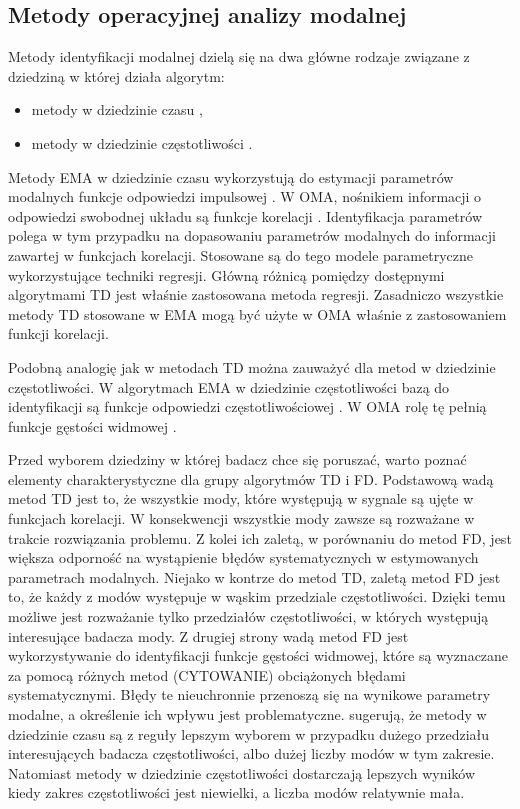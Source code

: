 \subsection{Metody operacyjnej analizy modalnej}

Metody identyfikacji modalnej dzielą się na dwa główne rodzaje związane z dziedziną w której działa algorytm:
\begin{itemize}[noitemsep]
	\item metody w dziedzinie czasu ,
	\item metody w dziedzinie częstotliwości .
\end{itemize}
Metody EMA w dziedzinie czasu wykorzystują do estymacji parametrów modalnych funkcje odpowiedzi impulsowej . W OMA, nośnikiem informacji o odpowiedzi swobodnej układu  są funkcje korelacji . Identyfikacja parametrów polega w tym przypadku na dopasowaniu parametrów modalnych do informacji zawartej w funkcjach korelacji. Stosowane są do tego modele parametryczne wykorzystujące techniki regresji. Główną różnicą pomiędzy dostępnymi algorytmami TD jest właśnie zastosowana metoda regresji. Zasadniczo wszystkie metody TD stosowane w EMA mogą być użyte w OMA właśnie z zastosowaniem funkcji korelacji. 


Podobną analogię jak w metodach TD można zauważyć dla metod w dziedzinie częstotliwości. W algorytmach EMA w dziedzinie częstotliwości bazą do identyfikacji są funkcje odpowiedzi częstotliwościowej . W OMA rolę tę pełnią funkcje gęstości widmowej .

Przed wyborem dziedziny w której badacz chce się poruszać, warto poznać elementy charakterystyczne dla grupy algorytmów TD i FD. Podstawową wadą metod TD jest to, że wszystkie mody, które występują w sygnale są ujęte w funkcjach korelacji. W konsekwencji wszystkie mody zawsze są rozważane w trakcie rozwiązania problemu. Z kolei ich zaletą, w porównaniu do metod FD, jest większa odporność na wystąpienie błędów systematycznych w estymowanych parametrach modalnych. Niejako w kontrze do metod TD, zaletą metod FD jest to, że każdy z modów występuje w wąskim przedziale częstotliwości. Dzięki temu możliwe jest rozważanie tylko przedziałów częstotliwości, w których występują interesujące badacza mody. Z drugiej strony wadą metod FD jest wykorzystywanie do identyfikacji funkcje gęstości widmowej, które są wyznaczane za pomocą różnych metod (CYTOWANIE) obciążonych błędami systematycznymi. Błędy te nieuchronnie przenoszą się na wynikowe parametry modalne, a określenie ich wpływu jest problematyczne. \cite{Maia1997} sugerują, że metody w dziedzinie czasu są z reguły lepszym wyborem w przypadku dużego przedziału interesujących badacza częstotliwości, albo dużej liczby modów w tym zakresie. Natomiast metody w dziedzinie częstotliwości dostarczają lepszych wyników kiedy zakres częstotliwości jest niewielki, a liczba modów relatywnie mała. 

